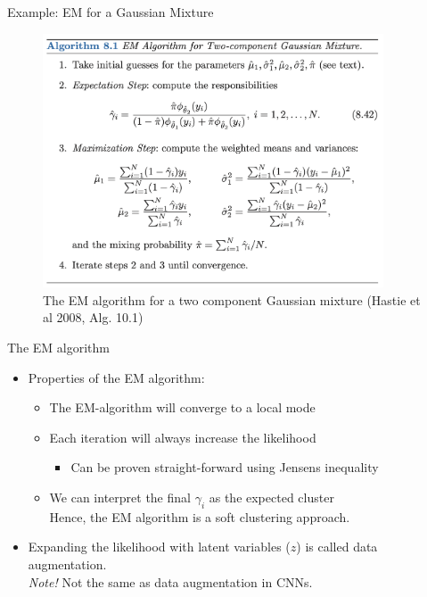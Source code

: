 \documentclass[10pt]{beamer}
\begin{document}
\begin{frame}{Example: EM for a Gaussian Mixture}

\begin{figure}[h]
\centering
\includegraphics[width=0.9\textwidth]{fig/algo_8_1_em_gaussian.png}
\caption{The EM algorithm for a two component Gaussian mixture (Hastie et al 2008, Alg. 10.1)}
\end{figure}

\end{frame}

\begin{frame}{The EM algorithm}

\begin{itemize}
\item Properties of the EM algorithm:
\begin{itemize}
\item The EM-algorithm will converge to a {\color{uured} local mode}\pause
\item Each iteration will {\color{uured} always} increase the likelihood
\begin{itemize}
\item Can be proven straight-forward using Jensens inequality%
\end{itemize}
\pause
\item We can interpret the final $\gamma_i$ as the {\color{uured} expected cluster}\\
Hence, the EM algorithm is a {\color{uured} soft clustering} approach.
\end{itemize}
\item Expanding the likelihood with latent variables ($z$) is called {\color{uured} data augmentation}.
\\ \emph{Note!} Not the same as data augmentation in CNNs.
\end{itemize}

\end{frame}
\end{document}

